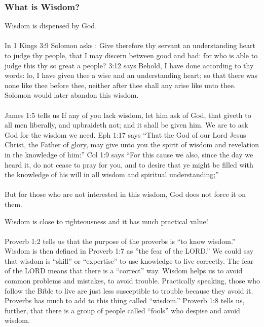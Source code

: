 \subsubsection{What is Wisdom?}
\begin{compactenum}
    \item Wisdom is dispensed by God. \\
    \\
    In 1  Kings 3:9 Solomon asks : Give therefore thy servant an understanding heart to judge thy people, that I may discern between good and bad: for who is able to judge this thy so great a people? 3:12 says Behold, I have done according to thy words: lo, I have given thee a wise and an understanding heart; so that there was none like thee before thee, neither after thee shall any arise like unto thee. Solomon would later abandon this wisdom.\\
    \\
    James 1:5 tells us If any of you lack wisdom, let him ask of God, that giveth to all men liberally, and upbraideth not; and it shall be given him. We are to ask God for the wisdom we need.  Eph 1:17 says ``That the God of our Lord Jesus Christ, the Father of glory, may give unto you the spirit of wisdom and revelation in the knowledge of him:'' Col 1:9 says ``For this cause we also, since the day we heard it, do not cease to pray for you, and to desire that ye might be filled with the knowledge of his will in all wisdom and spiritual understanding;'' \\
    \\
    But for those who are not interested in this wisdom, God does not force it on them.
    \item Wisdom is close to righteousness and it has much practical value!\\
    \\
    Proverb 1:2 tells us that the purpose of the proverbs is ``to know wisdom.'' Wisdom is then defined in Proverb 1:7 as ''the fear of the LORD.'' We could say that wisdom is ``skill'' or ``expertise'' to use knowledge to live correctly.  The fear of the LORD  means that there is a ``correct'' way. Wisdom helps us to avoid common problems and mistakes, to avoid trouble. Practically speaking, those who follow the Bible to live are just less susceptible to trouble because they avoid it.  Proverbs has much to add to this thing called ``wisdom.'' Proverb 1:8 tells us, further, that there is a group of people called ``fools'' who despise and avoid wisdom.\\

\end{compactenum}
